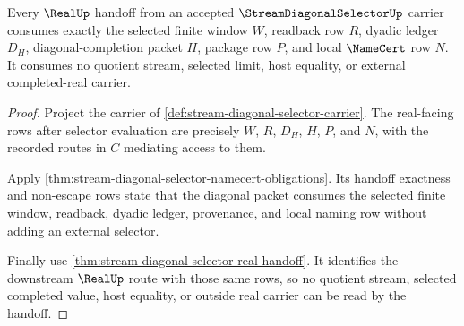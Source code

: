 \begin{theorem}
\label{thm:stream-diagonal-selector-handoff-exactness}
Every $\RealUp$ handoff from an accepted $\StreamDiagonalSelectorUp$ carrier consumes exactly the selected finite window $W$, readback row $R$, dyadic ledger $D_H$, diagonal-completion packet $H$, package row $P$, and local $\NameCert$ row $N$. It consumes no quotient stream, selected limit, host equality, or external completed-real carrier.
\end{theorem}
\begin{proof}
Project the carrier of \autoref{def:stream-diagonal-selector-carrier}. The real-facing rows after selector evaluation are precisely $W$, $R$, $D_H$, $H$, $P$, and $N$, with the recorded routes in $C$ mediating access to them.

Apply \autoref{thm:stream-diagonal-selector-namecert-obligations}. Its handoff exactness and non-escape rows state that the diagonal packet consumes the selected finite window, readback, dyadic ledger, provenance, and local naming row without adding an external selector.

Finally use \autoref{thm:stream-diagonal-selector-real-handoff}. It identifies the downstream $\RealUp$ route with those same rows, so no quotient stream, selected completed value, host equality, or outside real carrier can be read by the handoff.
\end{proof}

